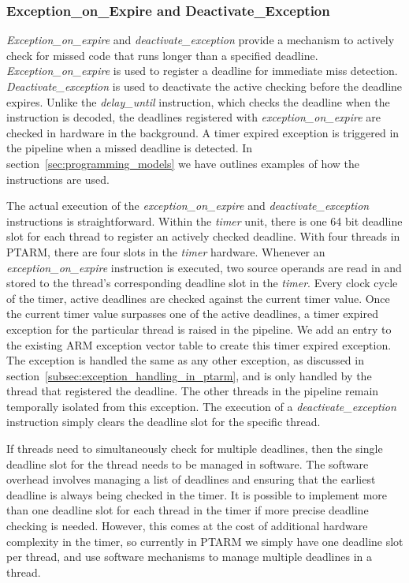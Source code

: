 \subsubsection{Exception\_on\_Expire and Deactivate\_Exception}    
\emph{Exception\_on\_expire} and \emph{deactivate\_exception} provide a mechanism to actively check for missed code that runs longer than a specified deadline.  
\emph{Exception\_on\_expire} is used to register a deadline for immediate miss detection. 
\emph{Deactivate\_exception} is used to deactivate the active checking before the deadline expires.   
Unlike the \emph{delay\_until} instruction, which checks the deadline when the instruction is decoded, the deadlines registered with \emph{exception\_on\_expire} are checked in hardware in the background. 
A timer expired exception is triggered in the pipeline when a missed deadline is detected.
In section~\ref{sec:programming_models} we have outlines examples of how the instructions are used.

The actual execution of the \emph{exception\_on\_expire} and \emph{deactivate\_exception} instructions is straightforward.    
Within the \emph{timer} unit, there is one 64 bit deadline slot for each thread to register an actively checked deadline.
With four threads in PTARM, there are four slots in the \emph{timer} hardware. 
Whenever an \emph{exception\_on\_expire} instruction is executed, two source operands are read in and stored to the thread's corresponding deadline slot in the \emph{timer}. 
Every clock cycle of the timer, active deadlines are checked against the current timer value.
Once the current timer value surpasses one of the active deadlines, a timer expired exception for the particular thread is raised in the pipeline.
We add an entry to the existing ARM exception vector table to create this timer expired exception. 
The exception is handled the same as any other exception, as discussed in section~\ref{subsec:exception_handling_in_ptarm}, and is only handled by the thread that registered the deadline. 
The other threads in the pipeline remain temporally isolated from this exception.
The execution of a \emph{deactivate\_exception} instruction simply clears the deadline slot for the specific thread.

If threads need to simultaneously check for multiple deadlines, then the single deadline slot for the thread needs to be managed in software.
The software overhead involves managing a list of deadlines and ensuring that the earliest deadline is always being checked in the timer. 
It is possible to implement more than one deadline slot for each thread in the timer if more precise deadline checking is needed. 
However, this comes at the cost of additional hardware complexity in the timer, so currently in PTARM we simply have one deadline slot per thread, and use software mechanisms to manage multiple deadlines in a thread. 

